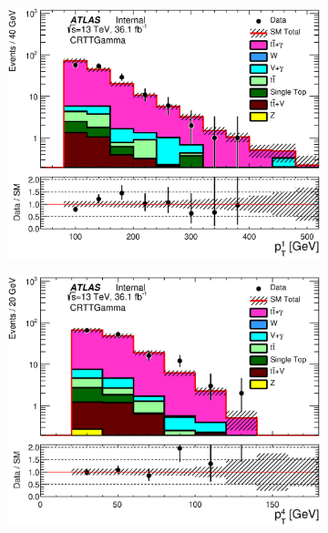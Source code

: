 \begin{figure}[h!]
\begin{center}
\begin{subfigure}[b]{0.40\textwidth}
                 \caption{ }
    \end{subfigure}
      \begin{subfigure}[b]{0.40\textwidth}    
\includegraphics[width=\textwidth]{figures/ttGamma/postfit/JetPt_1__CRTTGamma_log.eps}
                 \caption{ }
    \end{subfigure}
      \begin{subfigure}[b]{0.40\textwidth}    
\includegraphics[width=\textwidth]{figures/ttGamma/postfit/JetPt_4__CRTTGamma_log.eps}
                 \caption{ }
    \end{subfigure}

\end{center}
\end{figure}
